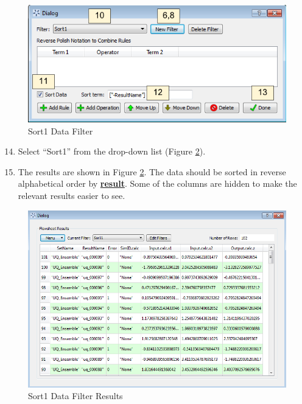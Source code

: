 \begin{figure}[H]
	\begin{center}
		\includegraphics[scale=0.55]{Chapt_flowsheet/figs/filter_1}
		\caption{Sort1 Data Filter}
		\label{fig.filter.1}
	\end{center}
\end{figure}

\begin{enumerate}
	\setcounter{enumi}{13}
	\item Select ``Sort1'' from the  drop-down list (Figure \ref{fig.filter.1.result}).
	\item The results are shown in Figure \ref{fig.filter.1.result}. The data should be sorted in reverse alphabetical order by \textbf{\underline{result}}. Some of the columns are hidden to make the relevant results easier to see.
\end{enumerate}

\begin{figure}[H]
	\begin{center}
		\includegraphics[scale=0.55]{Chapt_flowsheet/figs/filter_1_result}
		\caption{Sort1 Data Filter Results}
		\label{fig.filter.1.result}
	\end{center}
\end{figure}

